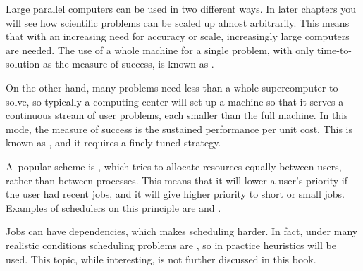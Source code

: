 
Large parallel computers can be used in two different ways. In later
chapters you will see how scientific problems can be scaled up almost
arbitrarily. This means that with an increasing need for accuracy or
scale, increasingly large computers are needed. The use of a whole
machine for a single problem, with only time-to-solution as the
measure of success, is known as .

On the other hand, many problems need less than a whole supercomputer
to solve, so typically a computing center will set up a machine so
that it serves a continuous stream of user problems, each smaller than
the full machine. In this mode, the measure of success is the
sustained performance per unit cost. This is known as
, and it requires a finely tuned
 strategy. 

A~popular scheme is
, which tries to allocate resources
equally between users, rather than between processes. This means
that it will lower a user's priority if the user had recent jobs, and it will 
give higher priority to short or small jobs. Examples of schedulers 
on this principle are  and .

Jobs can have dependencies, which makes scheduling harder. In fact,
under many realistic conditions scheduling problems are
, so in practice heuristics will be used.
This topic, while interesting, is not further discussed in this book.


